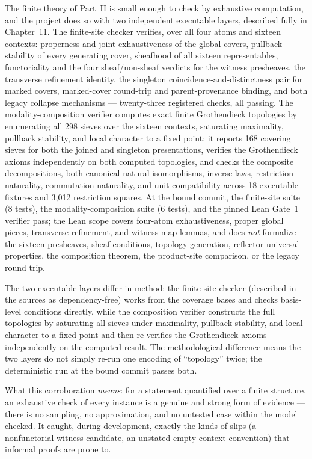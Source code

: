 The finite theory of Part~II is small enough to check by exhaustive
computation, and the project does so with two independent executable
layers, described fully in Chapter~11. The finite-site checker verifies,
over all four atoms and sixteen contexts: properness and joint
exhaustiveness of the global covers, pullback stability of every generating
cover, sheafhood of all sixteen representables, functoriality and the four
sheaf/non-sheaf verdicts for the witness presheaves, the transverse
refinement identity, the singleton coincidence-and-distinctness pair for
marked covers, marked-cover round-trip and parent-provenance binding, and
both legacy collapse mechanisms --- twenty-three registered checks, all
passing. The modality-composition verifier computes exact finite
Grothendieck topologies by enumerating all 298 sieves over the sixteen
contexts, saturating maximality, pullback stability, and local character to
a fixed point; it reports 168 covering sieves for both the joined and
singleton presentations, verifies the Grothendieck axioms independently on
both computed topologies, and checks the composite decompositions, both
canonical natural isomorphisms, inverse laws, restriction naturality,
commutation naturality, and unit compatibility across 18 executable
fixtures and 3{,}012 restriction squares. At the bound commit, the
finite-site suite (8 tests), the modality-composition suite (6 tests), and
the pinned Lean Gate~1 verifier pass; the Lean scope covers four-atom
exhaustiveness, proper global pieces, transverse refinement, and
witness-map lemmas, and does \emph{not} formalize the sixteen presheaves,
sheaf conditions, topology generation, reflector universal properties, the
composition theorem, the product-site comparison, or the legacy round trip.

The two executable layers differ in method: the finite-site checker
(described in the sources as dependency-free) works from the coverage bases
and checks basis-level conditions directly, while the composition verifier
constructs the full topologies by saturating all sieves under maximality,
pullback stability, and local character to a fixed point and then
re-verifies the Grothendieck axioms independently on the computed result.
The methodological difference means the two layers do not simply re-run one
encoding of ``topology'' twice; the deterministic run at the bound commit
passes both.

What this corroboration \emph{means}: for a statement quantified over a
finite structure, an exhaustive check of every instance is a genuine and
strong form of evidence --- there is no sampling, no approximation, and no
untested case within the model checked. It caught, during development,
exactly the kinds of slips (a nonfunctorial witness candidate, an unstated
empty-context convention) that informal proofs are prone to.

